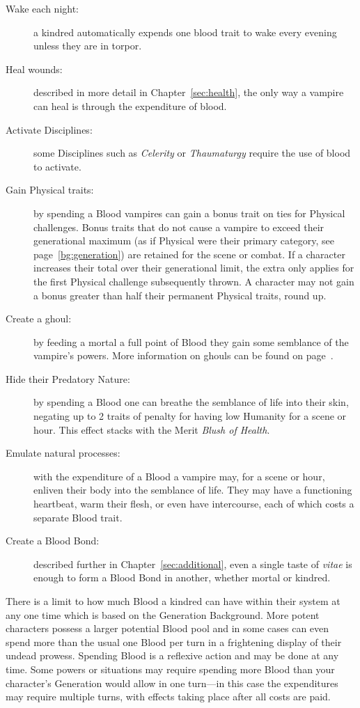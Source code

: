 \begin{description}
	\item[Wake each night:] a kindred automatically expends one blood 
	trait to wake every evening unless they are in torpor.
	\item[Heal wounds:] described in more detail in Chapter~\ref{sec:health}, the only 
	way a vampire can heal is through the expenditure of blood.
	\item[Activate Disciplines:] some Disciplines such as \emph{Celerity} 
	or \emph{Thaumaturgy} require the use of blood to activate.
	\item[Gain Physical traits:] by spending a Blood vampires can gain a bonus trait 
	on ties for Physical challenges.  Bonus traits that do not cause a vampire to exceed 
	their generational maximum (as if Physical were their primary category, see 
	page~\ref{bg:generation}) are retained for the scene or combat.  If a character increases 
	their total over their generational limit, the extra only applies for the first Physical 
	challenge subsequently thrown.  A character may not gain a bonus greater than half their 
	permanent Physical traits, round up.
	\item[Create a ghoul:] by feeding a mortal a full point of Blood they gain some semblance 
	of the vampire's powers.  More information on ghouls can be found on page~\pageref{subsec:ghouls}. 
	\item[Hide their Predatory Nature:] by spending a Blood one can breathe the semblance 
	of life into their skin, negating up to 2 traits of penalty for having low Humanity for 
	a scene or hour.  This effect stacks with the Merit \emph{Blush of Health}.
	\item[Emulate natural processes:] with the expenditure of a Blood a vampire may, for a 
	scene or hour, enliven their body into the semblance of life.  They may have a functioning 
	heartbeat, warm their flesh, or even have intercourse, each of which costs a separate Blood trait.
	\item[Create a Blood Bond:] described further in Chapter~\ref{sec:additional}, even a single 
	taste of \emph{vitae} is enough to form a Blood Bond in another, whether mortal or kindred. \\
\end{description}

\noindent There is a limit to how much Blood a kindred can have within their system 
at any one time which is based on the Generation Background.  More potent 
characters possess a larger potential Blood pool and in some cases can even 
spend more than the usual one Blood per turn in a frightening display of their undead 
prowess.  Spending Blood is a reflexive action and may be done at any time.  
Some powers or situations may require spending more Blood than your 
character's Generation would allow in one turn---in this case the 
expenditures may require multiple turns, with effects taking place after all 
costs are paid.

